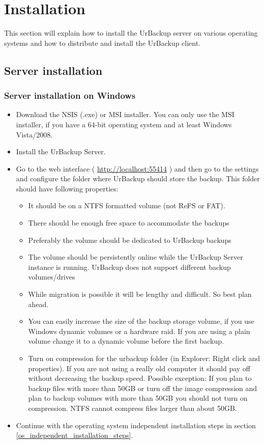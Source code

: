 \documentclass[a4paper,10pt]{article}
\begin{document}
\section{Installation}
\label{installation}

This section will explain how to install the UrBackup server on various operating
systems and how to distribute and install the UrBackup client.

\subsection{Server installation}

\subsubsection{Server installation on Windows}

\begin{itemize}
  \item Download the NSIS (.exe) or MSI installer. You can only use the MSI installer, if you have
a 64-bit operating system and at least Windows Vista/2008.
   \item Install the UrBackup Server.
   \item Go to the web interface ( \url{http://localhost:55414} ) and then go to the settings and configure
   the folder where UrBackup should store the backup. This folder should have following properties:
   \begin{itemize}
     \item It should be on a NTFS formatted volume (not ReFS or FAT).
     \item There should be enough free space to accommodate the backups
     \item Preferably the volume should be dedicated to UrBackup backups
     \item The volume should be persistently online while the UrBackup Server instance is running. UrBackup does
     not support different backup volumes/drives
     \item While migration is possible it will be lengthy and difficult. So best plan ahead.
     \item You can easily increase the size of the backup storage volume, if you use Windows dynamic
     volumes or a hardware raid. If you are using a plain volume change it to a dynamic volume before the
     first backup.
     \item Turn on compression for the urbackup folder (in Explorer: Right click and properties). If you are not using a really old computer it should pay off without decreasing the backup speed. Possible exception: If you plan to backup files with more than 50GB or turn off the image compression and plan to backup volumes with more than 50GB you should not turn on compression. NTFS cannot compress files larger than about 50GB.
   \end{itemize}
   \item Continue with the operating system independent installation steps in section \ref{os_independent_installation_steps}. 
\end{itemize}
\end{document}
